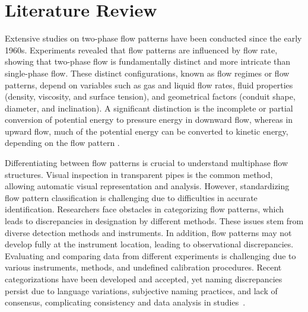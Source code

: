 \section{Literature Review}
\label{LitReview}
Extensive studies on two-phase flow patterns have been conducted since the early 1960s. Experiments revealed that flow patterns are influenced by flow rate, showing that two-phase flow is fundamentally distinct and more intricate than single-phase flow. These distinct configurations, known as flow regimes or flow patterns, depend on variables such as gas and liquid flow rates, fluid properties (density, viscosity, and surface tension), and geometrical factors (conduit shape, diameter, and inclination). A significant distinction is the incomplete or partial conversion of potential energy to pressure energy in downward flow, whereas in upward flow, much of the potential energy can be converted to kinetic energy, depending on the flow pattern \cite{hewitt1969phase,taitel1976model,mandhane1974flow,matsui1984identification,matsui1986identification,kokal1989aexperimental,ekberg1999gas,spedding1993flow,hong1997effect}.

Differentiating between flow patterns is crucial to understand multiphase flow structures. Visual inspection in transparent pipes is the common method, allowing automatic visual representation and analysis. However, standardizing flow pattern classification is challenging due to difficulties in accurate identification. Researchers face obstacles in categorizing flow patterns, which leads to discrepancies in designation by different methods. These issues stem from diverse detection methods and instruments. In addition, flow patterns may not develop fully at the instrument location, leading to observational discrepancies. Evaluating and comparing data from different experiments is challenging due to various instruments, methods, and undefined calibration procedures. Recent categorizations have been developed and accepted, yet naming discrepancies persist due to language variations, subjective naming practices, and lack of consensus, complicating consistency and data analysis in studies~\cite{songsiri2004tow,abduvayt2003effects,hernandez2006fast,kokal1989aexperimental,ekberg1999gas,spedding1993flow,bousman1996gas,elperin2002flow,somchai2006flow}.

